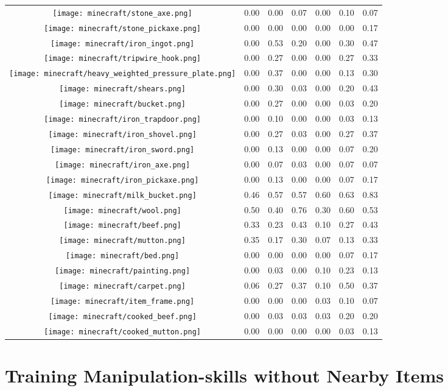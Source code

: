 \documentclass{article}
\newcommand{\mcbed}{\texttt{[image: minecraft/bed.png]}}
\newcommand{\mcbeef}{\texttt{[image: minecraft/beef.png]}}
\newcommand{\mcbucket}{\texttt{[image: minecraft/bucket.png]}}
\newcommand{\mccarpet}{\texttt{[image: minecraft/carpet.png]}}
\newcommand{\mccookedbeef}{\texttt{[image: minecraft/cooked\_beef.png]}}
\newcommand{\mccookedmutton}{\texttt{[image: minecraft/cooked\_mutton.png]}}
\newcommand{\mcironingot}{\texttt{[image: minecraft/iron\_ingot.png]}}
\newcommand{\mcitemframe}{\texttt{[image: minecraft/item\_frame.png]}}
\newcommand{\mcmilkbucket}{\texttt{[image: minecraft/milk\_bucket.png]}}
\newcommand{\mcmutton}{\texttt{[image: minecraft/mutton.png]}}
\newcommand{\mcpainting}{\texttt{[image: minecraft/painting.png]}}
\newcommand{\mcshears}{\texttt{[image: minecraft/shears.png]}}
\newcommand{\mcstonepickaxe}{\texttt{[image: minecraft/stone\_pickaxe.png]}}
\newcommand{\mcwool}{\texttt{[image: minecraft/wool.png]}}
\newcommand{\mcheavypressureplate}{\texttt{[image: minecraft/heavy\_weighted\_pressure\_plate.png]}}
\newcommand{\mcironaxe}{\texttt{[image: minecraft/iron\_axe.png]}}
\newcommand{\mcironpickaxe}{\texttt{[image: minecraft/iron\_pickaxe.png]}}
\newcommand{\mcironshovel}{\texttt{[image: minecraft/iron\_shovel.png]}}
\newcommand{\mcironsword}{\texttt{[image: minecraft/iron\_sword.png]}}
\newcommand{\mcirontrapdoor}{\texttt{[image: minecraft/iron\_trapdoor.png]}}
\newcommand{\mcstoneaxe}{\texttt{[image: minecraft/stone\_axe.png]}}
\newcommand{\mctripwirehook}{\texttt{[image: minecraft/tripwire\_hook.png]}}
\begin{document}
\begin{table}[htbp]
\begin{tabular}{ccccccc}
    \mcstoneaxe & 0.00 & 0.00 & 0.07 & 0.00 & 0.10 & 0.07 \\
    \mcstonepickaxe  & 0.00  & 0.00 & 0.00 & 0.00 & 0.00 & 0.17 \\  
    \midrule
    \mcironingot & 0.00 & 0.53 & 0.20 & 0.00 & 0.30 & 0.47 \\
    \mctripwirehook & 0.00 & 0.27 & 0.00 & 0.00 & 0.27 & 0.33 \\
    \mcheavypressureplate & 0.00 & 0.37 & 0.00 & 0.00 & 0.13 & 0.30 \\
    \mcshears & 0.00 & 0.30 & 0.03 & 0.00 & 0.20 & 0.43 \\
    \mcbucket & 0.00 & 0.27 & 0.00 & 0.00 & 0.03 & 0.20 \\
    \mcirontrapdoor & 0.00 & 0.10 & 0.00 & 0.00 & 0.03 & 0.13  \\
    \mcironshovel & 0.00 & 0.27 & 0.03 & 0.00 & 0.27 & 0.37 \\
    \mcironsword & 0.00 & 0.13 & 0.00 & 0.00 & 0.07 & 0.20 \\
    \mcironaxe & 0.00 & 0.07 & 0.03 & 0.00 & 0.07 & 0.07 \\
    \mcironpickaxe & 0.00 & 0.13 & 0.00 & 0.00 & 0.07 & 0.17 \\
    \midrule
    \mcmilkbucket  &  0.46 & 0.57 & 0.57 & 0.60 & 0.63 & 0.83 \\
    \mcwool  & 0.50  & 0.40 & 0.76 & 0.30 & 0.60 & 0.53 \\
    \mcbeef  &  0.33 & 0.23 & 0.43 & 0.10 & 0.27 & 0.43 \\
    \mcmutton  &  0.35 & 0.17 & 0.30 & 0.07 & 0.13 & 0.33 \\
    \mcbed  & 0.00  & 0.00 & 0.00 & 0.00 & 0.07 & 0.17 \\
    \mcpainting  & 0.00  & 0.03 & 0.00 & 0.10 & 0.23 & 0.13 \\
    \mccarpet  & 0.06  & 0.27 & 0.37 & 0.10 & 0.50 & 0.37 \\
    \mcitemframe  & 0.00  & 0.00 & 0.00 & 0.03 & 0.10 & 0.07 \\
    \mccookedbeef  &  0.00 & 0.03 & 0.03 & 0.03 & 0.20 & 0.20 \\
    \mccookedmutton  & 0.00  & 0.00 & 0.00 & 0.00 & 0.03 & 0.13 \\
    \bottomrule
  \end{tabular}
\end{table}

\section{Training Manipulation-skills without Nearby Items}
\label{appendix:go-explore}
\end{document}
